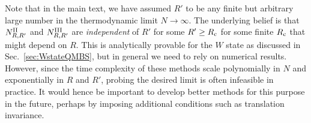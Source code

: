 \documentclass[prx,letterpaper,aps,superscriptaddress,floatfix,twocolumn,nofootinbib]{revtex4-2}
\theoremstyle{definition}
\begin{document}
%
Note that in the main text, we have assumed $R'$ to be any finite but arbitrary large number in the thermodynamic limit $N \rightarrow \infty$. 
%
The underlying belief is that $N^{\rm II}_{R, R'}$ and $N^{\rm III}_{R, R'}$ are \textit{independent} of $R'$ for some $R' \geq R_{\rm c}$ for some finite $R_{\rm c}$ that might depend on $R$.
%
This is analytically provable for the $W$ state as discussed in Sec.~\ref{sec:WstateQMBS}, but in general we need to rely on numerical results.
%
However, since the time complexity of these methods scale polynomially in $N$ and exponentially in $R$ and $R'$, probing the desired limit is often infeasible in practice.
%
It would hence be important to develop better methods for this purpose in the future, perhaps by imposing additional conditions such as translation invariance.
%

%
\end{document}

